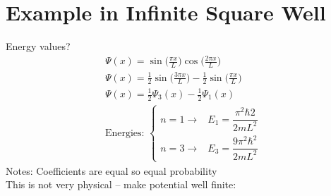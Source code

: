 \documentclass[a4paper, 11pt, fleqn, normalem]{report}
\begin{document}
\section{Example in Infinite Square Well}
Energy values?
\begin{gather*}
    \Psi(x) = \sin\Big(\frac{\pi x}{L}\Big)\cos\Big(\frac{2\pi x}{L}\Big) \\
    \Psi(x) = \frac{1}{2}\sin\Big(\frac{3\pi x}{L}\Big) - \frac{1}{2}\sin\Big(\frac{\pi x}{L}\Big) \\
    \Psi(x) = \frac{1}{2}\Psi_{3}(x) - \frac{1}{2}\Psi_{1}(x) \\
    \text{Energies: }
    \begin{cases}
        n = 1 \rightarrow& E_{1} = \dfrac{\pi^{2}\hbar{2}}{2mL^{2}} \\
        n = 3 \rightarrow& E_{3} = \dfrac{9\pi^{2}\hbar^{2}}{2mL^{2}}
    \end{cases}
\end{gather*}
Notes: Coefficients are equal so equal probability \\
This is not very physical -- make potential well finite:
\end{document}
